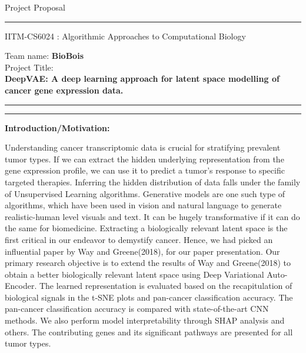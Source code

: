 \documentclass[12pt]{exam}
\begin{document}
\noindent
\begin{center}\large{Project Proposal}\end{center}
\hrule
\vspace{3mm}
\noindent 
{\sf IITM-CS6024 : Algorithmic Approaches to Computational Biology  \hfill }
\noindent
\begin{flushleft} 
{\sf Team name: \textbf{BioBois} \hfill  }\\
\noindent
{\sf Project Title:\\ \textbf{DeepVAE: A deep learning approach for latent space modelling of cancer gene expression data.}}
\end{flushleft}
\hrule
\vspace{3mm}



\vspace{3mm}
\hrule
\vspace{2mm}
\begin{flushleft}\textbf{Introduction/Motivation:}\end{flushleft}
Understanding cancer transcriptomic data is crucial for stratifying prevalent tumor types. If we can extract the hidden underlying representation from the gene expression profile, we can use it to predict a tumor's response to specific targeted therapies. Inferring the hidden distribution of data falls under the family of Unsupervised Learning algorithms. Generative models are one such type of algorithms, which have been used in vision and natural language to generate realistic-human level visuals and text. It can be hugely transformative if it can do the same for biomedicine. Extracting a biologically relevant latent space is the first critical in our endeavor to demystify cancer. Hence, we had picked an influential paper by Way and Greene(2018)\textsuperscript{\cite{q5c}}, for our paper presentation. Our primary research objective is to extend the results of Way and Greene(2018)\textsuperscript{\cite{q5c}} to obtain a better biologically relevant latent space using Deep Variational Auto-Encoder. The learned representation is evaluated based on the recapitulation of biological signals in the t-SNE plots and pan-cancer classification accuracy. The pan-cancer classification accuracy is compared with state-of-the-art CNN methods. We also perform model interpretability through SHAP analysis and others. The contributing genes and its significant pathways are presented for all tumor types. \\
\end{document}
